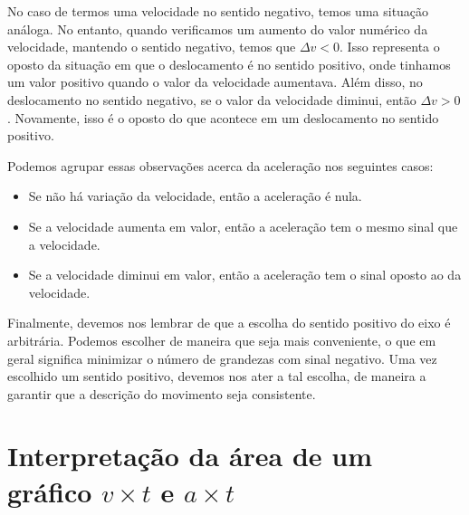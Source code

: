 No caso de termos uma velocidade no sentido negativo, temos uma situação análoga. No entanto, quando verificamos um aumento do valor numérico da velocidade, mantendo o sentido negativo, temos que $\Delta v < 0$. Isso representa o oposto da situação em que o deslocamento é no sentido positivo, onde tinhamos um valor positivo quando o valor da velocidade aumentava. Além disso, no deslocamento no sentido negativo, se o valor da velocidade diminui, então $\Delta v > 0$. Novamente, isso é o oposto do que acontece em um deslocamento no sentido positivo.

Podemos agrupar essas observações acerca da aceleração nos seguintes casos:
\begin{itemize}
    \item Se não há variação da velocidade, então a aceleração é nula.
    \item Se a velocidade aumenta em valor, então a aceleração tem o mesmo sinal que a velocidade.
    \item Se a velocidade diminui em valor, então a aceleração tem o sinal oposto ao da velocidade.
\end{itemize}

Finalmente, devemos nos lembrar de que a escolha do sentido positivo do eixo é arbitrária. Podemos escolher de maneira que seja mais conveniente, o que em geral significa minimizar o número de grandezas com sinal negativo. Uma vez escolhido um sentido positivo, devemos nos ater a tal escolha, de maneira a garantir que a descrição do movimento seja consistente.

\section{Interpretação da área de um gráfico $v \times t$ e $a \times t$}


